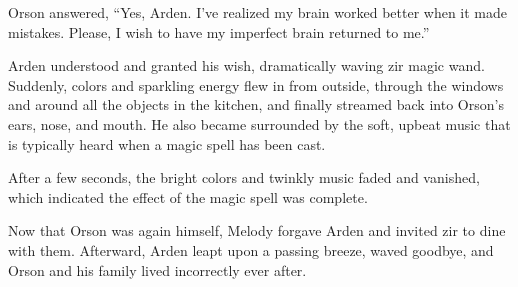 Orson answered, “Yes, Arden. I've realized my brain worked better when it made mistakes. Please, I wish to have my imperfect brain returned to me.”

Arden understood and granted his wish, dramatically waving zir magic wand. Suddenly, colors and sparkling energy flew in from outside, through the windows and around all the objects in the kitchen, and finally streamed back into Orson's ears, nose, and mouth. He also became surrounded by the soft, upbeat music that is typically heard when a magic spell has been cast.

After a few seconds, the bright colors and twinkly music faded and vanished, which indicated the effect of the magic spell was complete.

Now that Orson was again himself, Melody forgave Arden and invited zir to dine with them. Afterward, Arden leapt upon a passing breeze, waved goodbye, and Orson and his family lived incorrectly ever after.